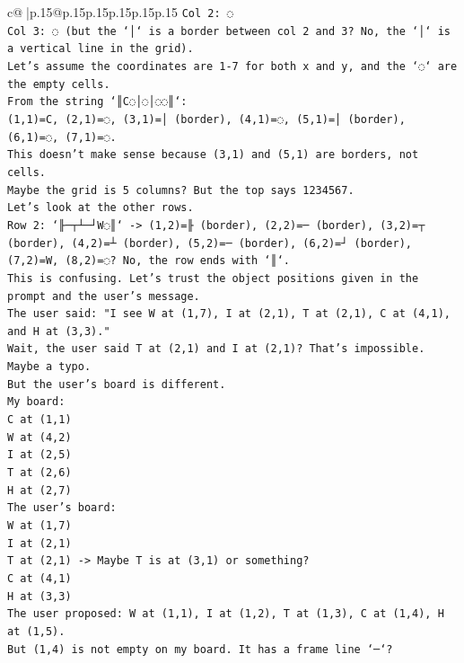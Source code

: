 \documentclass{article}
\begin{document}
{\begin{supertabular}{c@{$\;$}|p{.15\linewidth}@{}p{.15\linewidth}p{.15\linewidth}p{.15\linewidth}p{.15\linewidth}p{.15\linewidth}}
{{{\texttt{Col 2: ◌} \\
\texttt{Col 3: ◌ (but the `│` is a border between col 2 and 3? No, the `│` is a vertical line in the grid).} \\
\texttt{Let's assume the coordinates are 1{-}7 for both x and y, and the `◌` are the empty cells.} \\
\texttt{From the string `║C◌│◌│◌◌║`:} \\
\texttt{(1,1)=C, (2,1)=◌, (3,1)=│ (border), (4,1)=◌, (5,1)=│ (border), (6,1)=◌, (7,1)=◌.} \\
\texttt{This doesn't make sense because (3,1) and (5,1) are borders, not cells.} \\
\texttt{Maybe the grid is 5 columns? But the top says 1234567.} \\
\texttt{Let's look at the other rows.} \\
\texttt{Row 2: `╟─┬┴─┘W◌║` {-}> (1,2)=╟ (border), (2,2)=─ (border), (3,2)=┬ (border), (4,2)=┴ (border), (5,2)=─ (border), (6,2)=┘ (border), (7,2)=W, (8,2)=◌? No, the row ends with `║`.} \\
\texttt{This is confusing. Let's trust the object positions given in the prompt and the user's message.} \\
\texttt{The user said: "I see W at (1,7), I at (2,1), T at (2,1), C at (4,1), and H at (3,3)."} \\
\texttt{Wait, the user said T at (2,1) and I at (2,1)? That's impossible. Maybe a typo.} \\
\texttt{But the user's board is different.} \\
\texttt{My board:} \\
\texttt{C at (1,1)} \\
\texttt{W at (4,2)} \\
\texttt{I at (2,5)} \\
\texttt{T at (2,6)} \\
\texttt{H at (2,7)} \\
\texttt{The user's board:} \\
\texttt{W at (1,7)} \\
\texttt{I at (2,1)} \\
\texttt{T at (2,1) {-}> Maybe T is at (3,1) or something?} \\
\texttt{C at (4,1)} \\
\texttt{H at (3,3)} \\
\texttt{The user proposed: W at (1,1), I at (1,2), T at (1,3), C at (1,4), H at (1,5).} \\
\texttt{But (1,4) is not empty on my board. It has a frame line `─`?} \\
}}}
\end{supertabular}}
\end{document}
